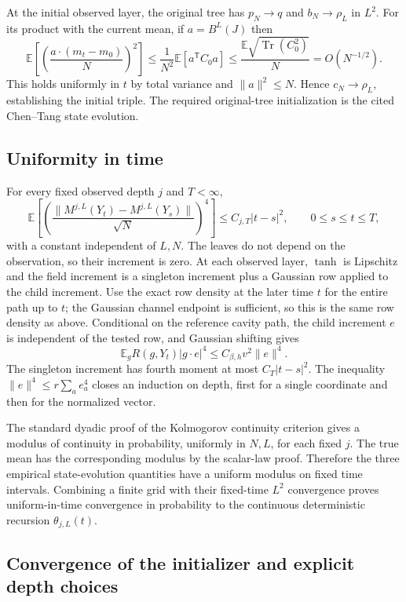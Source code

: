 \documentclass[11pt,reqno]{amsart}
\begin{document}
At the initial observed layer, the original tree has
$p_N\to q$ and $b_N\to\rho_L$ in $L^2$.
For its product with the current mean, if $a=B^L(J)$ then
\[
 \mathbb E\left[\left(\frac{a\cdot(m_t-m_0)}N\right)^2\right]
 \le\frac1{N^2}\mathbb E[a^{\mathsf T}C_0a]
 \le\frac{\mathbb E\sqrt{\operatorname{Tr}(C_0^2)}}N
 =O(N^{-1/2}).
\]
This holds uniformly in $t$ by total variance and $\|a\|^2\le N$.
Hence $c_N\to\rho_L$, establishing the initial triple.
The required original-tree initialization is the cited Chen--Tang state evolution.

\subsection{Uniformity in time}

For every fixed observed depth $j$ and $T<\infty$,
\[
 \mathbb E\left[
 \left(\frac{\|M^{j,L}(Y_t)-M^{j,L}(Y_s)\|}{\sqrt N}\right)^4\right]
 \le C_{j,T}|t-s|^2,\qquad 0\le s\le t\le T,
\]
with a constant independent of $L,N$.
The leaves do not depend on the observation, so their increment is zero.
At each observed layer, $\tanh$ is Lipschitz and the field increment is a
singleton increment plus a Gaussian row applied to the child increment.
Use the exact row density at the later time $t$ for the entire path up to
$t$; the Gaussian channel endpoint is sufficient, so this is the same
row density as above.  Conditional on the reference cavity path, the
child increment $e$ is independent of the tested row, and Gaussian shifting
gives
\[
 \mathbb E_gR(g,Y_t)|g\cdot e|^4\le C_{\beta,h}v^2\|e\|^4.
\]
The singleton increment has fourth moment at most $C_T|t-s|^2$.
The inequality $\|e\|^4\le r\sum_a e_a^4$ closes an induction on depth,
first for a single coordinate and then for the normalized vector.

The standard dyadic proof of the Kolmogorov continuity criterion gives a
modulus of continuity in probability, uniformly in $N,L$, for each fixed
$j$. The true mean has the corresponding modulus by the scalar-law proof.
Therefore the three empirical state-evolution quantities have a uniform
modulus on fixed time intervals. Combining a finite grid with their
fixed-time $L^2$ convergence proves uniform-in-time convergence in
probability to the continuous deterministic recursion $\theta_{j,L}(t)$.

\subsection{Convergence of the initializer and explicit depth choices}
\end{document}
